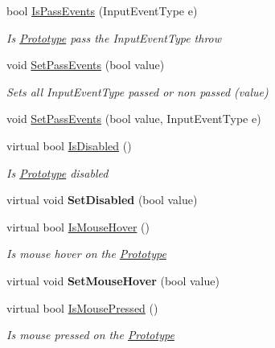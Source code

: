 \begin{DoxyCompactItemize}
bool \mbox{\hyperlink{class_space_v_i_l_1_1_prototype_a83b522f952145604406023cd2b3ffa10}{Is\+Pass\+Events}} (Input\+Event\+Type e)
\begin{DoxyCompactList}\small\item\em Is \mbox{\hyperlink{class_space_v_i_l_1_1_prototype}{Prototype}} pass the Input\+Event\+Type throw \end{DoxyCompactList}\item 
void \mbox{\hyperlink{class_space_v_i_l_1_1_prototype_ac2a3bb6f4b5c26dba5375eabf774de74}{Set\+Pass\+Events}} (bool value)
\begin{DoxyCompactList}\small\item\em Sets all Input\+Event\+Type passed or non passed (value) \end{DoxyCompactList}\item 
void \mbox{\hyperlink{class_space_v_i_l_1_1_prototype_a412b7eb2ed5ee06834127b06aa04a1fd}{Set\+Pass\+Events}} (bool value, Input\+Event\+Type e)
\item 
virtual bool \mbox{\hyperlink{class_space_v_i_l_1_1_prototype_acfe05e01f98da47801861ce5cc03640a}{Is\+Disabled}} ()
\begin{DoxyCompactList}\small\item\em Is \mbox{\hyperlink{class_space_v_i_l_1_1_prototype}{Prototype}} disabled \end{DoxyCompactList}\item 
\mbox{\label{class_space_v_i_l_1_1_prototype_ac0aa16bd73553f26bcb8bd7124684e4c}} 
virtual void {\bfseries Set\+Disabled} (bool value)
\item 
virtual bool \mbox{\hyperlink{class_space_v_i_l_1_1_prototype_a6b8dcf54d97cc24aa7ef347bd33f8664}{Is\+Mouse\+Hover}} ()
\begin{DoxyCompactList}\small\item\em Is mouse hover on the \mbox{\hyperlink{class_space_v_i_l_1_1_prototype}{Prototype}} \end{DoxyCompactList}\item 
\mbox{\label{class_space_v_i_l_1_1_prototype_a02c7d02f9e07f43769ce48d0263b04ea}} 
virtual void {\bfseries Set\+Mouse\+Hover} (bool value)
\item 
virtual bool \mbox{\hyperlink{class_space_v_i_l_1_1_prototype_a0cf4369361d82f9398292f3d727388ab}{Is\+Mouse\+Pressed}} ()
\begin{DoxyCompactList}\small\item\em Is mouse pressed on the \mbox{\hyperlink{class_space_v_i_l_1_1_prototype}{Prototype}} \end{DoxyCompactList}\item 

\end{DoxyCompactItemize}
